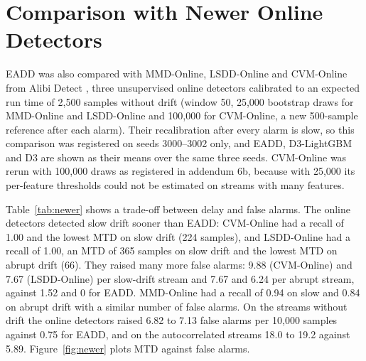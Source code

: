 \section{Comparison with Newer Online Detectors}
\label{sec:newer}

EADD was also compared with MMD-Online, LSDD-Online \citep{CobbSequential2022} and CVM-Online \citep{RossAdams2012} from Alibi Detect \citep{AlibiDetect}, three unsupervised online detectors calibrated to an expected run time of 2,500 samples without drift (window 50, 25,000 bootstrap draws for MMD-Online and LSDD-Online and 100,000 for CVM-Online, a new 500-sample reference after each alarm). Their recalibration after every alarm is slow, so this comparison was registered on seeds 3000--3002 only, and EADD, D3-LightGBM and D3 are shown as their means over the same three seeds. CVM-Online was rerun with 100,000 draws as registered in addendum 6b, because with 25,000 its per-feature thresholds could not be estimated on streams with many features.

Table~\ref{tab:newer} shows a trade-off between delay and false alarms. The online detectors detected slow drift sooner than EADD: CVM-Online had a recall of 1.00 and the lowest MTD on slow drift (224 samples), and LSDD-Online had a recall of 1.00, an MTD of 365 samples on slow drift and the lowest MTD on abrupt drift (66). They raised many more false alarms: 9.88 (CVM-Online) and 7.67 (LSDD-Online) per slow-drift stream and 7.67 and 6.24 per abrupt stream, against 1.52 and 0 for EADD. MMD-Online had a recall of 0.94 on slow and 0.84 on abrupt drift with a similar number of false alarms. On the streams without drift the online detectors raised 6.82 to 7.13 false alarms per 10,000 samples against 0.75 for EADD, and on the autocorrelated streams 18.0 to 19.2 against 5.89. Figure~\ref{fig:newer} plots MTD against false alarms.

